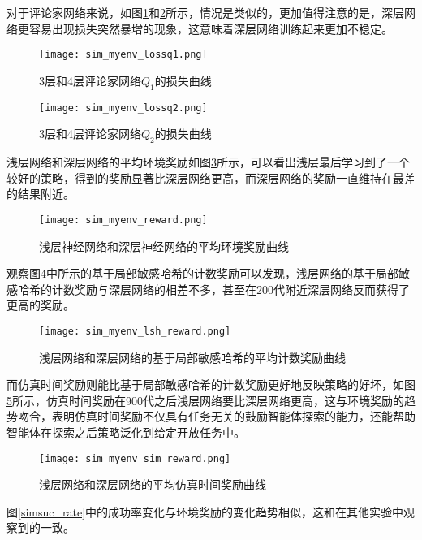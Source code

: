 对于评论家网络来说，如图\ref{simlossq1}和\ref{simlossq2}所示，情况是类似的，更加值得注意的是，深层网络更容易出现损失突然暴增的现象，这意味着深层网络训练起来更加不稳定。
        \begin{figure}[htpb]
        \centering
        \texttt{[image: sim\_myenv\_lossq1.png]}
        \caption{3层和4层评论家网络$Q_1$的损失曲线}
            \label{simlossq1}
        \end{figure}

        \begin{figure}[htpb]
        \centering
        \texttt{[image: sim\_myenv\_lossq2.png]}
        \caption{3层和4层评论家网络$Q_2$的损失曲线}
            \label{simlossq2}
        \end{figure}

浅层网络和深层网络的平均环境奖励如图\ref{simenv_reward}所示，可以看出浅层最后学习到了一个较好的策略，得到的奖励显著比深层网络更高，而深层网络的奖励一直维持在最差的结果附近。

        \begin{figure}[htpb]
        \centering
        \texttt{[image: sim\_myenv\_reward.png]}
        \caption{浅层神经网络和深层神经网络的平均环境奖励曲线}
            \label{simenv_reward}
        \end{figure}

观察图\ref{simlsh_reward}中所示的基于局部敏感哈希的计数奖励可以发现，浅层网络的基于局部敏感哈希的计数奖励与深层网络的相差不多，甚至在200代附近深层网络反而获得了更高的奖励。

        \begin{figure}[htpb]
        \centering
        \texttt{[image: sim\_myenv\_lsh\_reward.png]}
        \caption{浅层网络和深层网络的基于局部敏感哈希的平均计数奖励曲线}
            \label{simlsh_reward}
        \end{figure}
而仿真时间奖励则能比基于局部敏感哈希的计数奖励更好地反映策略的好坏，如图\ref{simsim_reward}所示，仿真时间奖励在900代之后浅层网络要比深层网络更高，这与环境奖励的趋势吻合，表明仿真时间奖励不仅具有任务无关的鼓励智能体探索的能力，还能帮助智能体在探索之后策略泛化到给定开放任务中。

        \begin{figure}[htpb]
        \centering
        \texttt{[image: sim\_myenv\_sim\_reward.png]}
        \caption{浅层网络和深层网络的平均仿真时间奖励曲线}
            \label{simsim_reward}
        \end{figure}
图\ref{simsuc_rate}中的成功率变化与环境奖励的变化趋势相似，这和在其他实验中观察到的一致。

